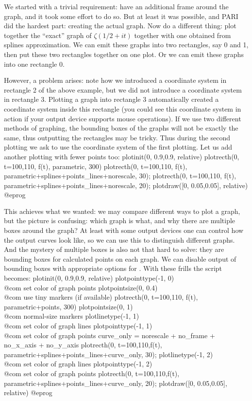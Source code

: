 We started with a trivial requirement: have an additional frame around
the graph, and it took some effort to do so.  But at least it was possible,
and PARI did the hardest part: creating the actual graph.
Now do a different thing: plot together the ``exact'' graph of 
$\zeta({1/2}+it)$ together with one obtained from splines approximation.
We can emit these graphs into two rectangles, say 0 and 1, then put these
two rectangles together on one plot.  Or we can emit these graphs into one
rectangle 0.

However, a problem arises: note how we
introduced a coordinate system in rectangle 2 of the above example, but we
did not introduce a coordinate system in rectangle 3.  Plotting a
graph into rectangle 3 automatically created a coordinate system
inside this rectangle (you could see this coordinate system in action
if your output device supports mouse operations).  If we use two different
methods of graphing, the bounding boxes of the graphs will not be exactly
the same, thus outputting the rectangles may be tricky.  Thus during
the second plotting we ask  to use the coordinate system of
the first plotting.  Let us add another plotting with fewer
points too:
\bprog
plotinit(0, 0.9,0.9, relative)
plotrecth(0, t=100,110, f(t), parametric, 300)
plotrecth(0, t=100,110, f(t), parametric+splines+points_lines+norescale, 30);
plotrecth(0, t=100,110, f(t), parametric+splines+points_lines+norescale, 20);
plotdraw([0, 0.05,0.05], relative)
@eprog

This achieves what we wanted: we may compare different ways to plot a graph,
but the picture is confusing: which graph is what, and why there are multiple
boxes around the graph?  At least with some output devices one can control
how the output curves look like, so we can use this to distinguish different
graphs.  And the mystery of multiple boxes is also not that hard to solve:
they are bounding boxes for calculated points on each graph.  We can disable
output of bounding boxes with appropriate options for .
With these frills the script becomes:
\bprog
plotinit(0, 0.9,0.9, relative)
plotpointtype(-1, 0)                \\@com set color of graph points
plotpointsize(0, 0.4)               \\@com use tiny markers (if available)
plotrecth(0, t=100,110, f(t), parametric+points, 300)
plotpointsize(0, 1)                 \\@com normal-size markers
plotlinetype(-1, 1)                 \\@com set color of graph lines
plotpointtype(-1, 1)                \\@com set color of graph points
curve_only = norescale + no_frame + no_x_axis + no_y_axis
plotrecth(0, t=100,110,f(t), parametric+splines+points_lines+curve_only, 30);
plotlinetype(-1, 2)                 \\@com set color of graph lines
plotpointtype(-1, 2)                \\@com set color of graph points
plotrecth(0, t=100,110,f(t), parametric+splines+points_lines+curve_only, 20);
plotdraw([0, 0.05,0.05], relative)
@eprog

